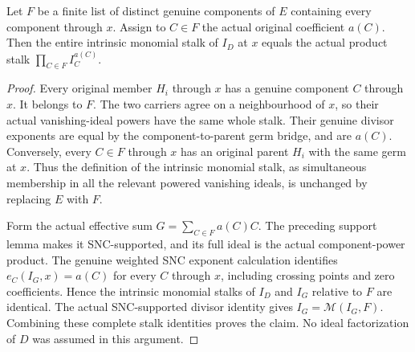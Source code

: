\begin{lemma}
\label{hir:monomial-local-component-product-dictionary}
\leanok
Let $F$ be a finite list of distinct genuine components of $E$ containing
every component through $x$.  Assign to $C\in F$ the actual original
coefficient $a(C)$.  Then the entire intrinsic monomial stalk of $I_D$
at $x$ equals the actual product stalk $\prod_{C\in F}I_C^{a(C)}$.
\end{lemma}
\begin{proof}
Every original member $H_i$ through $x$ has a genuine component $C$
through $x$.  It belongs to $F$.  The two carriers agree on a neighbourhood
of $x$, so their actual vanishing-ideal powers have the same whole stalk.
Their genuine divisor exponents are equal by the component-to-parent
germ bridge, and are $a(C)$.  Conversely, every $C\in F$ through $x$
has an original parent $H_i$ with the same germ at $x$.  Thus the
definition of the intrinsic monomial stalk, as simultaneous membership
in all the relevant powered vanishing ideals, is unchanged by replacing
$E$ with $F$.

Form the actual effective sum $G=\sum_{C\in F}a(C)C$.  The preceding
support lemma makes it SNC-supported, and its full ideal is the actual
component-power product.  The genuine weighted SNC exponent calculation
identifies $e_C(I_G,x)=a(C)$ for every $C$ through $x$, including crossing
points and zero coefficients.  Hence the intrinsic monomial stalks of
$I_D$ and $I_G$ relative to $F$ are identical.  The actual SNC-supported
divisor identity gives $I_G=\mathcal M(I_G,F)$.  Combining these complete
stalk identities proves the claim.  No ideal factorization of $D$ was
assumed in this argument.
\end{proof}

